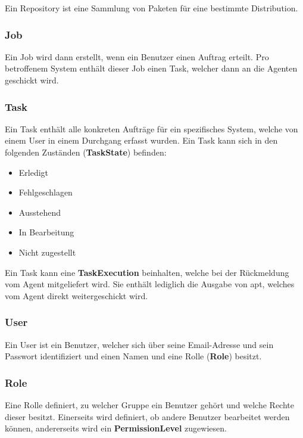 Ein Repository ist eine Sammlung von Paketen für eine bestimmte Distribution.

\subsubsection{Job}

Ein Job wird dann erstellt, wenn ein Benutzer einen Auftrag erteilt. Pro betroffenem System enthält dieser Job einen Task, welcher dann an die Agenten geschickt wird.

\subsubsection{Task}

Ein Task enthält alle konkreten Aufträge für ein spezifisches System, welche von einem User in einem Durchgang erfasst wurden. Ein Task kann sich in den folgenden Zuständen (\textbf{TaskState}) befinden:

\begin{itemize}
    \item Erledigt 
    \item Fehlgeschlagen 
    \item Ausstehend
    \item In Bearbeitung
    \item Nicht zugestellt
\end{itemize}

Ein Task kann eine \textbf{TaskExecution} beinhalten, welche bei der Rückmeldung vom Agent mitgeliefert wird. Sie enthält lediglich die Ausgabe von \gls{apt}, welches vom Agent direkt weitergeschickt wird.

\subsubsection{User}

Ein User ist ein Benutzer, welcher sich über seine Email-Adresse und sein Passwort identifiziert und einen Namen und eine Rolle (\textbf{Role}) besitzt.

\subsubsection{Role}

Eine Rolle definiert, zu welcher Gruppe ein Benutzer gehört und welche Rechte dieser besitzt. Einerseits wird definiert, ob andere Benutzer bearbeitet werden können, andererseits wird ein \textbf{PermissionLevel} zugewiesen.

